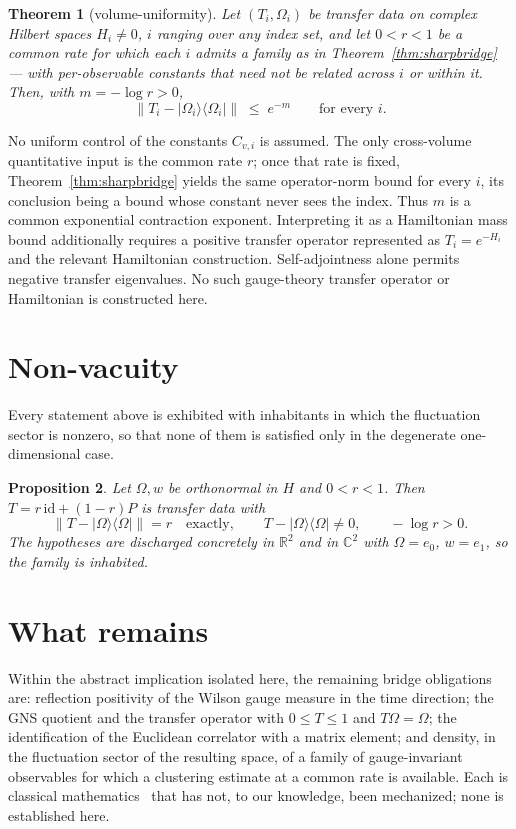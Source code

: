 \documentclass[11pt]{article}
\newtheorem{theorem}{Theorem}[section]
\newtheorem{proposition}[theorem]{Proposition}
\theoremstyle{definition}
\newcommand{\R}{\mathbb{R}}
\newcommand{\C}{\mathbb{C}}
\newcommand{\Om}{\Omega}
\newcommand{\ket}[1]{|#1\rangle}
\newcommand{\bra}[1]{\langle #1|}
\begin{document}
\begin{theorem}[volume-uniformity]
\label{thm:vu}
Let $(T_i,\Om_i)$ be transfer data on complex Hilbert spaces $H_i \neq 0$,
$i$ ranging over any index set, and let $0 < r < 1$ be a \emph{common}
rate for which each $i$ admits a family as in
Theorem~\ref{thm:sharpbridge} --- with per-observable constants that need
not be related across $i$ or within it.  Then, with $m = -\log r > 0$,
\[
  \|T_i - \ket{\Om_i}\bra{\Om_i}\| \;\le\; e^{-m}
  \qquad\text{for every } i .
\]
\end{theorem}

No uniform control of the constants $C_{v,i}$ is assumed.  The only
cross-volume quantitative input is the common rate $r$; once that rate is
fixed, Theorem~\ref{thm:sharpbridge} yields the same operator-norm bound
for every $i$, its conclusion being a bound whose constant never sees the
index.  Thus $m$ is a common exponential contraction exponent.
Interpreting it as a Hamiltonian mass bound additionally requires a
positive transfer operator represented as $T_i=e^{-H_i}$ and the relevant
Hamiltonian construction.  Self-adjointness alone permits negative
transfer eigenvalues.  No such gauge-theory transfer operator or
Hamiltonian is constructed here.

\section{Non-vacuity}

Every statement above is exhibited with inhabitants in which the
fluctuation sector is nonzero, so that none of them is satisfied only in
the degenerate one-dimensional case.

\begin{proposition}
\label{prop:nonvac}
Let $\Om, w$ be orthonormal in $H$ and $0 < r < 1$.  Then
$T = r\,\mathrm{id} + (1-r)P$ is transfer data with
\[
  \|T - \ket{\Om}\bra{\Om}\| = r \quad\text{exactly},\qquad
  T - \ket{\Om}\bra{\Om} \neq 0,\qquad -\log r > 0 .
\]
The hypotheses are discharged concretely in $\R^2$ and in $\C^2$ with
$\Om = e_0$, $w = e_1$, so the family is inhabited.
\end{proposition}

\section{What remains}

Within the abstract implication isolated here, the remaining bridge
obligations are: reflection positivity of the Wilson gauge measure in the
time direction; the GNS quotient and the transfer operator with
$0 \le T \le 1$ and $T\Om = \Om$; the identification of the Euclidean
correlator with a matrix element; and density, in the fluctuation sector
of the resulting space, of a family of gauge-invariant observables for
which a clustering estimate at a common rate is available.  Each is
classical mathematics~\cite{OsterwalderSeiler,GlimmJaffe} that has not, to
our knowledge, been mechanized; none is established here.
\end{document}
